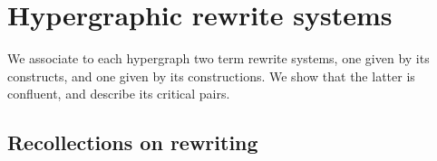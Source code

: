
\section{Hypergraphic rewrite systems} 
\label{s:rewriting}

We associate to each hypergraph two term rewrite systems, one given by its constructs, and one given by its constructions.
We show that the latter is confluent, and describe its critical pairs. 


\subsection{Recollections on rewriting}

